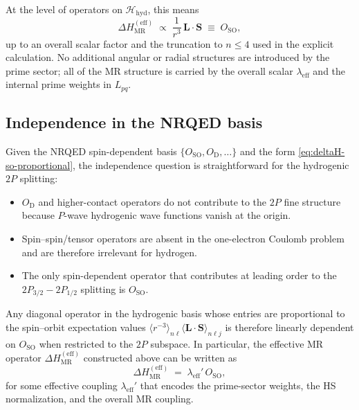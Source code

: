 \documentclass[11pt,a4paper]{article}
\newcommand{\DeltaHM}{\Delta H_{\mathrm{MR}}}
\begin{document}
At the level of operators on $\mathcal{H}_{\text{hyd}}$, this means
\begin{equation}
  \DeltaHM^{(\text{eff})}
  \;\propto\;
  \frac{1}{r^3}\,\mathbf{L}\cdot\mathbf{S}
  \;\equiv\;
  O_{\text{SO}},
  \label{eq:deltaH-so-proportional}
\end{equation}
up to an overall scalar factor and the truncation to $n\le 4$ used in
the explicit calculation. No additional angular or radial structures are
introduced by the prime sector; all of the MR structure is carried by
the overall scalar $\lambda_{\mathrm{eff}}$ and the internal prime
weights in $L_{pq}$.

\subsection{Independence in the NRQED basis}

Given the NRQED spin-dependent basis
$\{O_{\text{SO}}, O_{\text{D}}, \dots\}$ and the form
\eqref{eq:deltaH-so-proportional}, the independence question is
straightforward for the hydrogenic $2P$ splitting:

\begin{itemize}
  \item $O_{\text{D}}$ and higher-contact operators do not contribute to
    the $2P$ fine structure because $P$-wave hydrogenic wave functions
    vanish at the origin.
  \item Spin--spin/tensor operators are absent in the one-electron
    Coulomb problem and are therefore irrelevant for hydrogen.
  \item The only spin-dependent operator that contributes at leading
    order to the $2P_{3/2} - 2P_{1/2}$ splitting is $O_{\text{SO}}$.
\end{itemize}

Any diagonal operator in the hydrogenic basis whose entries are
proportional to the spin--orbit expectation values
$\langle r^{-3}\rangle_{n\ell}\langle \mathbf{L}\cdot\mathbf{S}\rangle_{n\ell j}$ is therefore
linearly dependent on $O_{\text{SO}}$ when restricted to the $2P$
subspace. In particular, the effective MR operator
$\DeltaHM^{(\text{eff})}$ constructed above can be written as
\begin{equation}
  \DeltaHM^{(\text{eff})}
  \;=\;
  \lambda_{\mathrm{eff}}'\, O_{\text{SO}},
\end{equation}
for some effective coupling $\lambda_{\mathrm{eff}}'$ that encodes the
prime-sector weights, the HS normalization, and the overall MR coupling.
\end{document}
